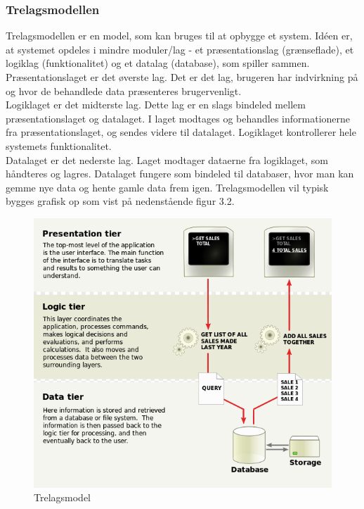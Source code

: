 \subsubsection{Trelagsmodellen}
Trelagsmodellen er en model, som kan bruges til at opbygge et system. Idéen er, at systemet opdeles i mindre moduler/lag - et præsentationslag (grænseflade), et logiklag (funktionalitet) og et datalag (database), som spiller sammen. \\
Præsentationslaget er det øverste lag. Det er det lag, brugeren har indvirkning på og hvor de behandlede data præsenteres brugervenligt. \\
Logiklaget er det midterste lag. Dette lag er en slags bindeled mellem præsentationslaget og datalaget. I laget modtages og behandles informationerne fra præsentationslaget, og sendes videre til datalaget. Logiklaget kontrollerer hele systemets funktionalitet.\\
Datalaget er det nederste lag. Laget modtager dataerne fra logiklaget, som håndteres og lagres. Datalaget fungere som bindeled til databaser, hvor man kan gemme nye data og hente gamle data frem igen. Trelagsmodellen vil typisk bygges grafisk op som vist på nedenstående figur 3.2.\\

\begin{figure}[H]
	\centering
	\includegraphics[width=1\textwidth]{Figurer/Snip20150415_39}
	\caption{Trelagsmodel\protect\footnotemark}
\end{figure}

